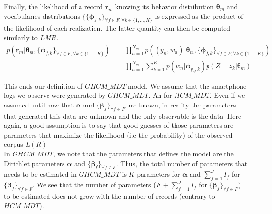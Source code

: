 Finally, the likelihood of a record $\mathbf{r}_{m}$ knowing its behavior distribution $\boldsymbol{\theta}_{m}$ and vocabularies distributions $\{\{\boldsymbol{\phi }_{f,k}\}_{\forall f \in F, \forall k\in\{1,...,K\}}$ is expressed as the product of the likelihood of each realization. The latter quantity can then be computed similarly to $LMR$.
\begin{equation}
\begin{aligned} 
p(\mathbf{r}_{m}|\boldsymbol{\theta }_{m}, \{\boldsymbol{\phi}_{f,k}\}_{\forall f \in F, \forall k\in\{1,...,K\}})&=\prod_{n=1}^{N_{m}}p((y_{n},w_{n})|\boldsymbol{\theta }_{m}, \{\boldsymbol{\phi}_{f,k}\}_{\forall f \in F, \forall k\in\{1,...,K\}})\\
&=\prod_{n=1}^{N_{m}}\sum_{k=1}^{K}p(w_{n}|\boldsymbol{\phi}_{y_{n},k})p(Z=z_{k}|\boldsymbol{\theta }_{m})
\end{aligned} 
\end{equation}
 
This ends our definition of $GHCM\_MDT$ model. We assume that the smartphone logs we observe were generated by $GHCM\_MDT$. An for $HCM\_MDT$. Even if we assumed until now that $\boldsymbol{\alpha}$ and $\{\boldsymbol{\beta }_{f}\}_{\forall f\in F}$ are known, in reality the parameters that generated this data are unknown and the only observable is the data. Here again, a good assumption is to say that good guesses of those parameters are parameters that maximize the likelihood (i.e the probability) of the observed corpus $L(R)$.
\\In $GHCM\_MDT$, we note that the parameters that defines the model are the Dirichlet parameters $\boldsymbol{\alpha}$ and $\{\boldsymbol{\beta }_{f}\}_{\forall f\in F}$. Thus, the total number of parameters that needs to be estimated in $GHCM\_MDT$ is $K$ parameters for $\boldsymbol{\alpha}$ and $\sum_{f=1}^{J}I_{f}$ for $\{\boldsymbol{\beta }_{f}\}_{\forall f\in F}$. We see that the number of parameters ($K+\sum_{f=1}^{J}I_{f}$ for $\{\boldsymbol{\beta }_{f}\}_{\forall f\in F}$) to be estimated does not grow with the number of records (contrary to $HCM\_MDT$). \par

